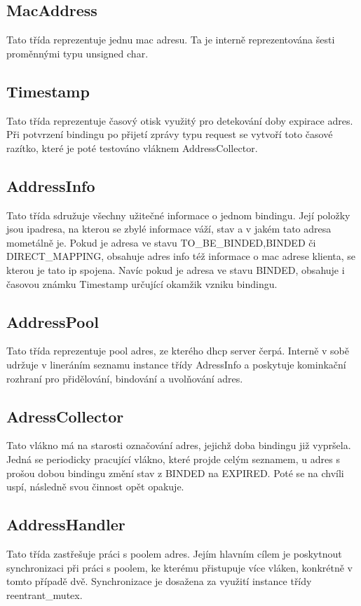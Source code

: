 \documentclass[12pt,a4paper]{report}
\begin{document}
\subsection*{MacAddress}
Tato třída reprezentuje jednu mac adresu. Ta je interně reprezentována šesti proměnnými typu unsigned char. 
\subsection*{Timestamp}
Tato třída reprezentuje časový otisk využitý pro detekování doby expirace adres. Při potvrzení bindingu po přijetí zprávy typu request se vytvoří toto časové razítko, které je poté testováno vláknem AddressCollector. 
\subsection*{AddressInfo}
Tato třída sdružuje všechny užitečné informace o jednom bindingu. Její položky jsou ipadresa, na kterou se zbylé informace váží, stav a v jakém tato adresa mometálně je. Pokud je adresa ve stavu TO\_BE\_BINDED,BINDED či DIRECT\_MAPPING, obsahuje adres info též informace o mac adrese klienta, se kterou je tato ip spojena. Navíc pokud je adresa ve stavu BINDED, obsahuje i časovou známku Timestamp určující okamžik vzniku bindingu.
\subsection*{AddressPool}
Tato třída reprezentuje pool adres, ze kterého dhcp server čerpá. Interně v sobě udržuje v lineráním seznamu instance třídy AdressInfo a poskytuje kominkační rozhraní pro přidělování, bindování a uvolňování adres.
\subsection*{AdressCollector}
Tato vlákno má na starosti označování adres, jejichž doba bindingu již vypršela. Jedná se periodicky pracující vlákno, které projde celým seznamem, u adres s prošou dobou bindingu změní stav z BINDED na EXPIRED. Poté se na chvíli uspí, následně svou činnost opět opakuje. 
\subsection*{AddressHandler}
Tato třída zastřešuje práci s poolem adres. Jejím hlavním cílem je poskytnout synchronizaci při práci s poolem, ke kterému přistupuje více vláken, konkrétně v tomto případě dvě. Synchronizace je dosažena za využití instance třídy reentrant\_mutex. 
\end{document}
